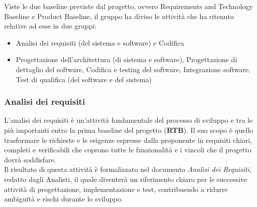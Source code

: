 \documentclass[a4paper,12pt]{article}
\begin{document}
            Viste le due baseline previste dal progetto, ovvero Requirements and Technology Baseline e Product Baseline, il gruppo ha diviso le attività che ha ritenuto relative ad esse in due gruppi:
            \begin{itemize}
                \item[\textbf{RTB}] Analisi dei requisiti (del sistema e software) e Codifica
                \item[\textbf{PB}] Progettazione dell'architettura (di sistema e software), Progettazione di dettaglio del software, Codifica e testing del software, Integrazione software, Test di qualifica (del software e del sistema)
            \end{itemize}

        \subsubsection{Analisi dei requisiti}
            L'analisi dei requisiti è un'attività fondamentale del processo di sviluppo e tra le più importanti entro la prima baseline del progetto (\textbf{RTB}).
            Il suo scopo è quello trasformare le richieste e le esigenze espresse dalla proponente in requisiti chiari, completi e verificabili che coprono tutte le funzionalità e i vincoli che il progetto dovrà soddisfare.\\
            Il risultato di questa attività è formalizzato nel documento \textit{Analisi dei Requisiti}, redatto dagli Analisti, il quale diventerà un riferimento chiaro per le successive attività di progettazione, implementazione e test, contribuendo a ridurre ambiguità e rischi durante lo sviluppo.
\end{document}
